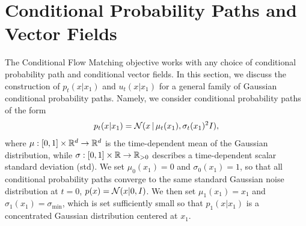 \documentclass{article}
\begin{document}



\section{Conditional Probability Paths and Vector Fields}
\label{sec:cond_paths}

The Conditional Flow Matching objective works with any choice of conditional probability path and conditional vector fields. In this section, we discuss the construction of $p_t(x \vert x_1)$ and $u_t(x \vert x_1)$ for a general family of Gaussian conditional probability paths. 
Namely, we consider conditional probability paths of the form
\begin{equation}\label{e:pt_gau}
    p_t(x\vert x_1) = {\mathcal{N}}(x\, \vert\, \mu_t(x_1), \sigma_t(x_1)^2 I ),
\end{equation}
where $\mu:[0,1]\times \mathbb R^d\rightarrow \mathbb R^d$ is the time-dependent mean of the Gaussian distribution, while $\sigma:[0,1]\times\mathbb R\rightarrow \mathbb R_{>0}$ describes a time-dependent scalar standard deviation (std).
%
We set $\mu_0(x_1) = 0$ and $\sigma_0(x_1) = 1$, so that all conditional probability paths converge to the same standard Gaussian noise distribution at $t=0$, $p(x)={\mathcal{N}}(x|0,I)$. We then set $\mu_1(x_1)=x_1$ and $\sigma_1(x_1)=\sigma_\text{min}$, which is set sufficiently small so that $p_1(x \vert x_1)$ is a concentrated Gaussian distribution centered at $x_1$.
\end{document}
